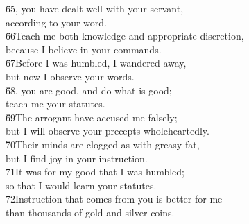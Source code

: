 \begin{poetry}
\poeml \v{65}, you have dealt well with your servant, \\
\poemll    according to your word. \\
\poeml \v{66}Teach me both knowledge and appropriate discretion, \\
\poemll    because I believe in your commands. \\
\poeml \v{67}Before I was humbled, I wandered away, \\
\poemll    but now I observe your words. \\
\poeml \v{68}, you are good, and do what is good; \\
\poemll    teach me your statutes. \\
\poeml \v{69}The arrogant have accused me falsely; \\
\poemll    but I will observe your precepts wholeheartedly. \\
\poeml \v{70}Their minds are clogged as with greasy fat, \\
\poemll    but I find joy in your instruction. \\
\poeml \v{71}It was for my good that I was humbled; \\
\poemll    so that I would learn your statutes. \\
\poeml \v{72}Instruction that comes from you is better for me \\
\poemll    than thousands of gold and silver coins.
\end{poetry}

